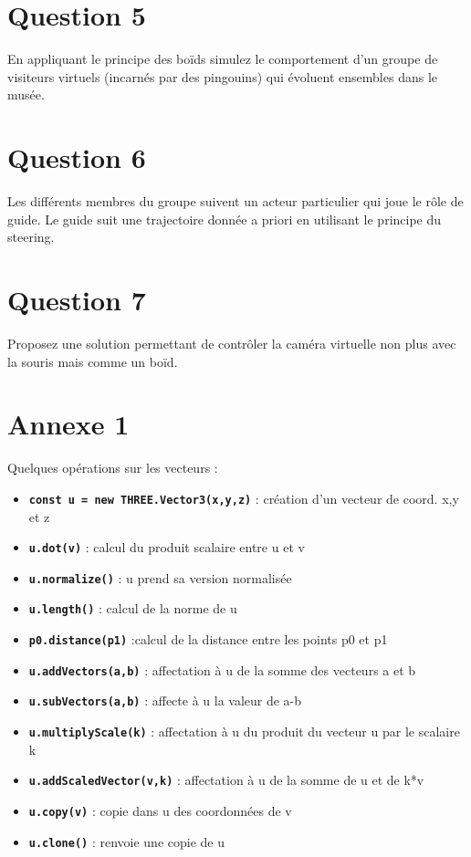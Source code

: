 \documentclass[10pt,a4paper,final,oneside,twoside,openright,openany,onecolumn]{article}
\begin{document}
	\section*{Question 5}
	En appliquant le principe des boïds  simulez le comportement d'un groupe de visiteurs virtuels (incarnés par des pingouins) qui évoluent ensembles dans le musée.
	
	\section*{Question 6}
	Les différents membres du groupe suivent un acteur particulier qui joue le rôle de guide. Le guide suit  une trajectoire donnée a priori en utilisant le principe du steering.  
	

	\section*{Question 7}
	Proposez une solution permettant de contrôler la caméra virtuelle non plus avec la souris mais comme un boïd.
\section*{Annexe 1}
Quelques opérations sur les vecteurs : 
\\
\begin{itemize}
	\item \textbf{\texttt{const u = new THREE.Vector3(x,y,z)}} : création d'un vecteur de coord. x,y et z
	\item  \textbf{\texttt{u.dot(v)}} : calcul du produit scalaire entre u et v
	\item  \textbf{\texttt{u.normalize()}} : u prend sa version normalisée
	\item  \textbf{\texttt{u.length()}} : calcul de la norme de u
	\item  \textbf{\texttt{p0.distance(p1)}} :calcul de la distance entre les points p0 et p1
	\item  \textbf{\texttt{u.addVectors(a,b)}} : affectation à u de la somme des vecteurs a et b
    \item \textbf{\texttt{u.subVectors(a,b)}} : affecte à u la valeur de a-b
	\item  \textbf{\texttt{u.multiplyScale(k)}} : affectation à u du produit du vecteur u par le scalaire k
	 \item \textbf{\texttt{u.addScaledVector(v,k)}} : affectation à u de la somme de u et de k*v
	 \item  \textbf{\texttt{u.copy(v)}} : copie dans u des coordonnées de v
	 \item  \textbf{\texttt{u.clone()}} : renvoie une copie de u
	
\end{itemize}
	
	
\end{document}
